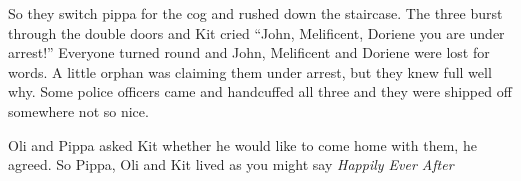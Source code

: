 So they switch pippa for the cog and rushed down the staircase. The
three burst through the double doors and Kit cried ``John, Melificent,
Doriene you are under arrest!'' Everyone turned round and John,
Melificent and Doriene were lost for words. A little orphan was claiming
them under arrest, but they knew full well why. Some police officers
came and handcuffed all three and they were shipped off somewhere not so
nice.

Oli and Pippa asked Kit whether he would like to come home with them, he
agreed. So Pippa, Oli and Kit lived as you might say \emph{\emph{Happily
Ever After}}
